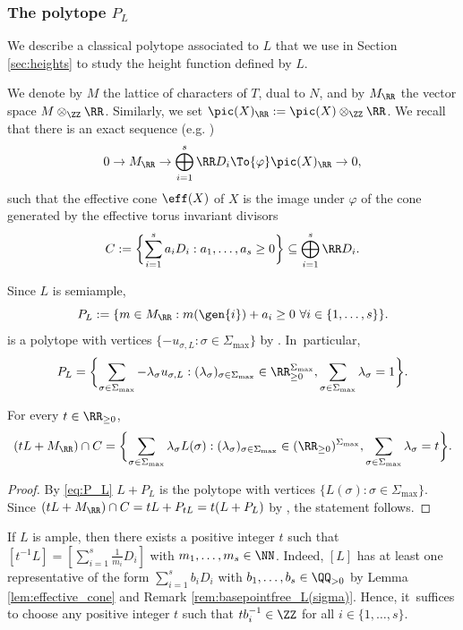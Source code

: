 \subsubsection{The polytope $P_L$}
We describe a classical polytope associated to $L$ that we use in
Section \ref{sec:heights} to study the height function defined by $L$.

We denote by $M$ the lattice of characters of $T$, dual to $N$,
and by $M_\RR$ the vector space $M\otimes_\ZZ \RR$.
Similarly, we set $\pic(X)_\RR:=\pic(X)\otimes_\ZZ\RR$.
We recall that there is an exact sequence (e.g. \cite[Th.\,4.2.1]{MR2810322})
\[
0
\to M_\RR
\to \bigoplus_{i=1}^s \RR D_i
\To{\varphi}\pic(X)_\RR
\to 0,
\]
such that the effective cone $\eff(X)$ of $X$ is the image under $\varphi$ of the cone generated by the
effective torus invariant divisors
\[
C:=\biggl \{\sum_{i=1}^s a_i D_i :
a_1,\dots, a_s\geq 0 \biggr \} \subseteq \bigoplus_{i=1}^s \RR D_i.
\]

Since $L$ is semiample,
\[
P_L:=\{m\in M_\RR: m(\gen{i})+a_i\geq 0\ \forall i\in\{1,\dots, s\}\}.
\]
is a polytope with vertices
$\{-u_{\sigma,L}:\sigma\in\Sigma_{\max}\}$
by \cite[Prop.\,4.3.8, Th.\,6.1.7]{MR2810322}. In~particular,
\begin{equation}
\label{eq:P_L}
P_L=\biggl\{\sum_{\sigma\in\Sigma_{\max}}-\lambda_\sigma u_{\sigma,L}:
(\lambda_\sigma)_{\sigma\in\Sigma_{\max}}\in\RR_{\geq0}^{\Sigma_{\max}},
\sum_{\sigma\in\Sigma_{\max}}\lambda_\sigma=1\biggr\}.
\end{equation}

\begin{lemma}
\label{lem:effective_cone}
For every $t\in\RR_{\geq0}$,
\[
(tL+M_\RR)\cap C=
\biggl \{\sum_{\sigma\in\Sigma_{\max}}\lambda_\sigma L(\sigma):
(\lambda_{\sigma})_{\sigma\in\Sigma_{\max}}\in (\RR_{\geq0})^{\Sigma_{\max}},
\sum_{\sigma\in\Sigma_{\max}}\lambda_{\sigma}=t \biggr \}.
\]
\end{lemma}
\begin{proof}
By \eqref{eq:P_L} $L+P_L$ is the polytope with vertices $\{L(\sigma):\sigma\in\Sigma_{\max}\}$.
Since $(tL+M_\RR)\cap C=tL+P_{tL}=t(L+P_L)$
by \cite[Exer.\,4.3.2]{MR2810322}, the statement follows.
\end{proof}

\begin{remark}
\label{rem:L_weights}
If $L$ is ample, then there exists a positive integer $t$
such that $[t^{-1}L]=\left [\sum_{i=1}^s\frac 1{m_i} D_i \right]$ with $m_1,\dots,m_s\in\NN$.
Indeed, $[L]$ has at least one representative of the form $\sum_{i=1}^sb_i D_i$
with $b_1,\dots,b_s\in \QQ_{>0}$ by Lemma \ref{lem:effective_cone}
and Remark \ref{rem:basepointfree_L(sigma)}.
Hence, it~suffices to choose any positive integer $t$ such that
$t b_i^{-1}\in\ZZ$ for all $i\in\{1,\dots,s\}$.
\end{remark}

